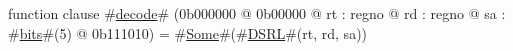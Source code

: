 function clause #\hyperref[zdecode]{decode}# (0b000000 @ 0b00000 @ rt : regno @ rd : regno @ sa : #\hyperref[zbits]{bits}#(5) @ 0b111010) =
  #\hyperref[zSome]{Some}#(#\hyperref[zDSRL]{DSRL}#(rt, rd, sa))
